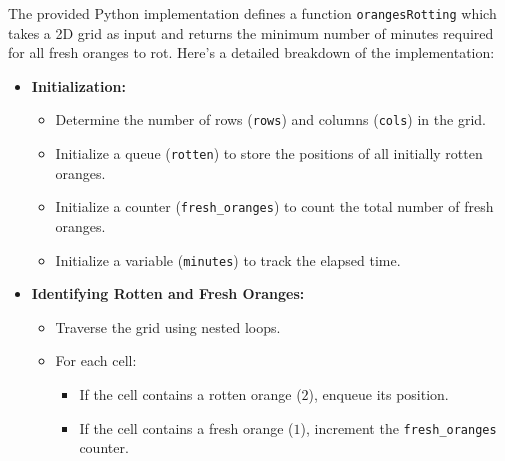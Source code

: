 The provided Python implementation defines a function \texttt{orangesRotting} which takes a 2D grid as input and returns the minimum number of minutes required for all fresh oranges to rot. Here's a detailed breakdown of the implementation:

\begin{itemize}
    \item \textbf{Initialization:}
    \begin{itemize}
        \item Determine the number of rows (\texttt{rows}) and columns (\texttt{cols}) in the grid.
        \item Initialize a queue (\texttt{rotten}) to store the positions of all initially rotten oranges.
        \item Initialize a counter (\texttt{fresh\_oranges}) to count the total number of fresh oranges.
        \item Initialize a variable (\texttt{minutes}) to track the elapsed time.
    \end{itemize}
    
    \item \textbf{Identifying Rotten and Fresh Oranges:}
    \begin{itemize}
        \item Traverse the grid using nested loops.
        \item For each cell:
        \begin{itemize}
            \item If the cell contains a rotten orange (\(2\)), enqueue its position.
            \item If the cell contains a fresh orange (\(1\)), increment the \texttt{fresh\_oranges} counter.
        \end{itemize}
    \end{itemize}
    

\end{itemize}
